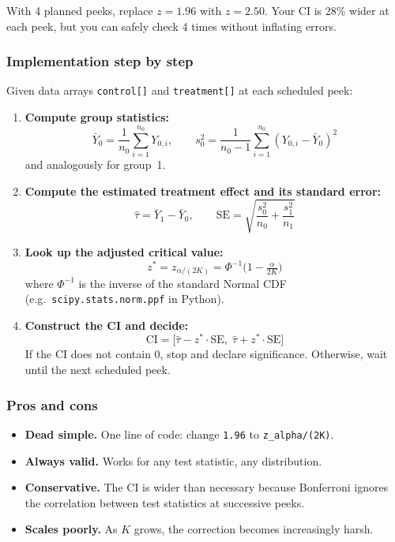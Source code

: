 \documentclass[12pt, a4paper]{article}
\begin{document}
\begin{plainlanguage}
With 4 planned peeks, replace $z = 1.96$ with $z = 2.50$.  Your CI is
28\% wider at each peek, but you can safely check 4 times without
inflating errors.
\end{plainlanguage}

\subsubsection*{Implementation step by step}

Given data arrays \texttt{control[]} and \texttt{treatment[]} at each
scheduled peek:

\begin{enumerate}
  \item \textbf{Compute group statistics:}
  \[
    \bar{Y}_0 = \frac{1}{n_0}\sum_{i=1}^{n_0} Y_{0,i}, \qquad
    s_0^2 = \frac{1}{n_0 - 1}\sum_{i=1}^{n_0}(Y_{0,i} - \bar{Y}_0)^2
  \]
  and analogously for group~1.

  \item \textbf{Compute the estimated treatment effect and its standard
        error:}
  \[
    \hat{\tau} = \bar{Y}_1 - \bar{Y}_0, \qquad
    \text{SE} = \sqrt{\frac{s_0^2}{n_0} + \frac{s_1^2}{n_1}}
  \]

  \item \textbf{Look up the adjusted critical value:}
  \[
    z^* = z_{\alpha/(2K)} = \Phi^{-1}\!\bigl(1 - \tfrac{\alpha}{2K}\bigr)
  \]
  where $\Phi^{-1}$ is the inverse of the standard Normal CDF 
  (e.g.\ \texttt{scipy.stats.norm.ppf} in Python).

  \item \textbf{Construct the CI and decide:}
  \[
    \text{CI} = \bigl[\hat{\tau} - z^* \cdot \text{SE},\;
                       \hat{\tau} + z^* \cdot \text{SE}\bigr]
  \]
  If the CI does not contain 0, stop and declare significance.
  Otherwise, wait until the next scheduled peek.
\end{enumerate}

\subsubsection*{Pros and cons}

\begin{itemize}[nosep]
  \item[\textcolor{green!60!black}{+}] \textbf{Dead simple.}  One line of
        code: change \texttt{1.96} to \texttt{z\_alpha/(2K)}.
  \item[\textcolor{green!60!black}{+}] \textbf{Always valid.}  Works for
        any test statistic, any distribution.
  \item[\textcolor{red}{--}] \textbf{Conservative.}  The CI is wider than
        necessary because Bonferroni ignores the correlation between test
        statistics at successive peeks.
  \item[\textcolor{red}{--}] \textbf{Scales poorly.}  As $K$ grows, the
        correction becomes increasingly harsh.
\end{itemize}
\end{document}
